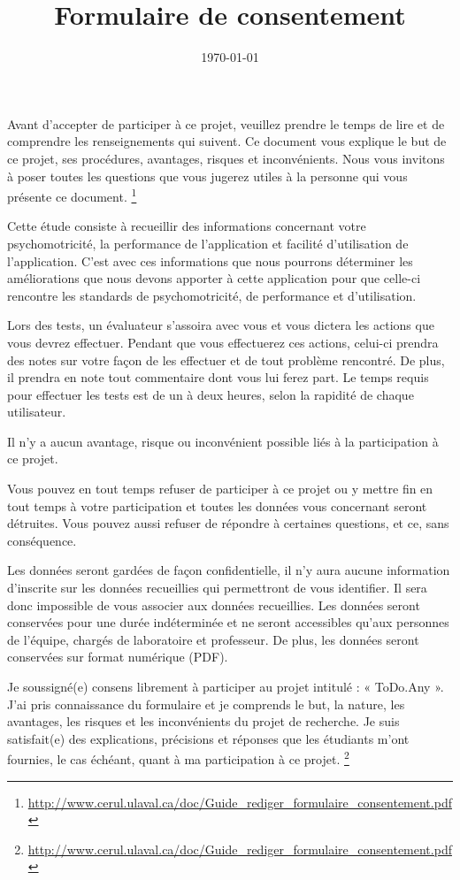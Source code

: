\documentclass[12pt,a4paper,oneside]{article}
\begin{document}
\title{Formulaire de consentement}
\date{\today}
\maketitle

Avant d’accepter de participer à ce projet, veuillez prendre le temps de lire et de comprendre les renseignements qui suivent. Ce document vous explique le but de ce projet, ses procédures, avantages, risques et inconvénients. Nous vous invitons à poser toutes les questions que vous jugerez utiles à la personne qui vous présente ce document. \footnote{\url{http://www.cerul.ulaval.ca/doc/Guide_rediger_formulaire_consentement.pdf}}

Cette étude consiste à recueillir des informations concernant votre psychomotricité, la performance de l'application et facilité d'utilisation de l'application. C'est avec ces informations que nous pourrons déterminer les améliorations que nous devons apporter à cette application pour que celle-ci rencontre les standards de psychomotricité, de performance et d'utilisation.

Lors des tests, un évaluateur s'assoira avec vous et vous dictera les actions que vous devrez effectuer. Pendant que vous effectuerez ces actions, celui-ci prendra des notes sur votre façon de les effectuer et de tout problème rencontré. De plus, il prendra en note tout commentaire dont vous lui ferez part. Le temps requis pour effectuer les tests est de un à deux heures, selon la rapidité de chaque utilisateur.

Il n'y a aucun avantage, risque ou inconvénient possible liés à la participation à ce projet.

Vous pouvez en tout temps refuser de participer à ce projet ou y mettre fin en tout temps à votre participation et toutes les données vous concernant seront détruites. Vous pouvez aussi refuser de répondre à certaines questions, et ce, sans conséquence.

Les données seront gardées de façon confidentielle, il n'y aura aucune information d'inscrite sur les données recueillies qui permettront de vous identifier. Il sera donc impossible de vous associer aux données recueillies. Les données seront conservées pour une durée indéterminée et ne seront accessibles qu'aux personnes de l'équipe, chargés de laboratoire et professeur. De plus, les données seront conservées sur format numérique (PDF).

\newpage

Je soussigné(e) \underline{\hspace{4.5cm}} consens librement à participer au projet intitulé : « ToDo.Any ». J’ai pris connaissance du formulaire et je comprends le but, la nature, les avantages, les risques et les inconvénients du projet de recherche. Je suis satisfait(e) des explications, précisions et réponses que les étudiants m’ont fournies, le cas échéant, quant à ma participation à ce projet. \footnote{\url{http://www.cerul.ulaval.ca/doc/Guide_rediger_formulaire_consentement.pdf}}
\end{document}

